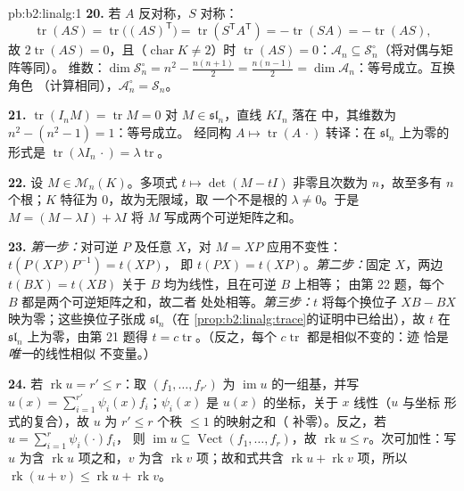 \begin{solution}{pb:b2:linalg:1}
\textbf{20.} 若 $A$ 反对称，$S$ 对称：
\[
\operatorname{tr}(AS) = \operatorname{tr}\bigl((AS)^{\mathsf
T}\bigr) = \operatorname{tr}(S^{\mathsf T}A^{\mathsf T}) =
-\operatorname{tr}(SA) = -\operatorname{tr}(AS),
\]
故 $2\operatorname{tr}(AS) = 0$，且（$\operatorname{char} K \neq
2$）时 $\operatorname{tr}(AS) = 0$：$\mathcal{A}_n \subseteq
\mathcal{S}_n^\circ$（将对偶与矩阵等同）。
维数：$\dim\mathcal{S}_n^\circ = n^2 - \frac{n(n+1)}2 =
\frac{n(n-1)}2 = \dim\mathcal{A}_n$：等号成立。互换角色
（计算相同），$\mathcal{A}_n^\circ = \mathcal{S}_n$。

\textbf{21.} $\operatorname{tr}(I_nM) = \operatorname{tr} M = 0$
对 $M \in \mathfrak{sl}_n$，直线 $KI_n$ 落在
中，其维数为 $n^2 - (n^2 - 1) = 1$：等号成立。
经同构 $A \mapsto
\operatorname{tr}(A\,\cdot)$ 转译：在
$\mathfrak{sl}_n$ 上为零的形式是 $\operatorname{tr}(\lambda I_n\,\cdot) =
\lambda\operatorname{tr}$。

\textbf{22.} 设 $M \in \mathcal{M}_n(K)$。多项式 $t
\mapsto \det(M - tI)$ 非零且次数为 $n$，故至多有
$n$ 个根；$K$ 特征为 $0$，故为无限域，取
一个不是根的 $\lambda \neq 0$。于是 $M = (M - \lambda I) +
\lambda I$ 将 $M$ 写成两个可逆矩阵之和。

\textbf{23.} \emph{第一步：}对可逆 $P$ 及任意
$X$，对 $M = XP$ 应用不变性：$t(P(XP)P^{-1}) = t(XP)$，
即 $t(PX) = t(XP)$。\emph{第二步：}固定 $X$，两边
$t(BX) = t(XB)$ 关于 $B$ 均为线性，且在可逆 $B$ 上相等；
由第 22 题，每个 $B$ 都是两个可逆矩阵之和，故二者
处处相等。\emph{第三步：}$t$ 将每个换位子 $XB
- BX$ 映为零；这些换位子张成 $\mathfrak{sl}_n$（在
\cref{prop:b2:linalg:trace}的证明中已给出），故 $t$ 在
$\mathfrak{sl}_n$ 上为零，由第 21 题得 $t =
c\operatorname{tr}$。（反之，每个 $c\operatorname{tr}$ 都是相似不变的：迹
恰是\emph{唯一}的线性相似
不变量。）

\textbf{24.} 若 $\operatorname{rk} u = r' \leq r$：取
$(f_1, \dots, f_{r'})$ 为 $\operatorname{im} u$ 的一组基，并写 $u(x)
= \sum_{i=1}^{r'} \psi_i(x) f_i$；$\psi_i(x)$ 是
$u(x)$ 的坐标，关于 $x$ 线性（$u$ 与坐标
形式的复合），故 $u$ 为 $r' \leq r$ 个秩 $\leq1$ 的映射之和（
补零）。反之，若 $u = \sum_{i=1}^r \psi_i(\cdot)f_i$，
则 $\operatorname{im} u \subseteq \operatorname{Vect}(f_1,
\dots, f_r)$，故 $\operatorname{rk} u \leq r$。次可加性：写
$u$ 为含 $\operatorname{rk} u$ 项之和，$v$ 为含
$\operatorname{rk} v$ 项；故和式共含 $\operatorname{rk} u +
\operatorname{rk} v$ 项，所以 $\operatorname{rk}(u + v) \leq
\operatorname{rk} u + \operatorname{rk} v$。


\end{solution}
